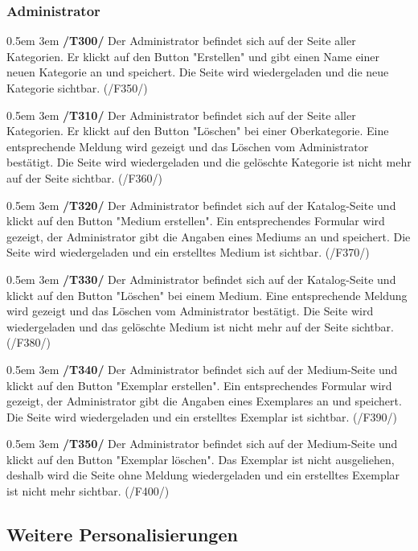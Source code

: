 \documentclass{article}
\newcommand{\specification}[3]{
	{\parindent 0.5em \hangindent 3em \hypertarget{spec:#1:#2}{\textbf{/#1#2/}} #3 \par \nobreak \vspace*{0.5em}}
}
\begin{document}
		\subsubsection{Administrator}
			\specification{T}{300}{Der Administrator befindet sich auf der Seite aller Kategorien. Er klickt auf den Button "Erstellen" und gibt einen Name einer neuen Kategorie an und speichert. Die Seite wird wiedergeladen und die neue Kategorie sichtbar. (/F350/) }
			\specification{T}{310}{Der Administrator befindet sich auf der Seite aller Kategorien. Er klickt auf den Button "Löschen" bei einer Oberkategorie. Eine entsprechende Meldung wird gezeigt und das Löschen vom Administrator bestätigt. Die Seite wird wiedergeladen und die gelöschte Kategorie ist nicht mehr auf der Seite sichtbar. (/F360/) }
			\specification{T}{320}{Der Administrator befindet sich auf der Katalog-Seite und klickt auf den Button "Medium erstellen". Ein entsprechendes Formular wird gezeigt, der Administrator gibt die Angaben eines Mediums an und speichert. Die Seite wird wiedergeladen und ein erstelltes Medium ist sichtbar. (/F370/)}
			\specification{T}{330}{Der Administrator befindet sich auf der Katalog-Seite und klickt auf den Button "Löschen" bei einem Medium. Eine entsprechende Meldung wird gezeigt und das Löschen vom Administrator bestätigt. Die Seite wird wiedergeladen und das gelöschte Medium ist nicht mehr auf der Seite sichtbar. (/F380/) }
			\specification{T}{340}{Der Administrator befindet sich auf der Medium-Seite und klickt auf den Button "Exemplar erstellen". Ein entsprechendes Formular wird gezeigt, der Administrator gibt die Angaben eines Exemplares an und speichert. Die Seite wird wiedergeladen und ein erstelltes Exemplar ist sichtbar. (/F390/)}
			\specification{T}{350}{Der Administrator befindet sich auf der Medium-Seite und klickt auf den Button "Exemplar löschen". Das Exemplar ist nicht ausgeliehen, deshalb wird die Seite ohne Meldung wiedergeladen und ein erstelltes Exemplar ist nicht mehr sichtbar. (/F400/)}
	\subsection{Weitere Personalisierungen}
\end{document}
